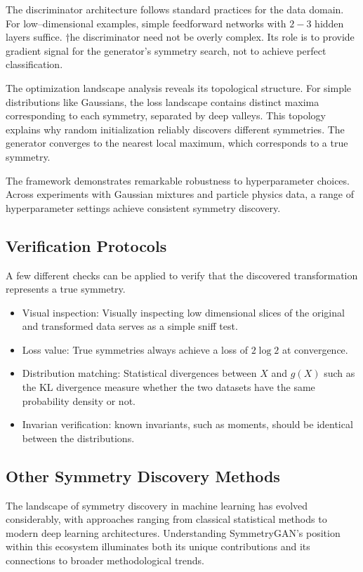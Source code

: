     The discriminator architecture follows standard practices for the data domain.
    For low--dimensional examples, simple feedforward networks with \(2-3\) hidden layers suffice.
    †he discriminator need not be overly complex.
    Its role is to provide gradient signal for the generator's symmetry search, not to achieve perfect classification.

    The optimization landscape analysis reveals its topological structure.
    For simple distributions like Gaussians, the loss landscape contains distinct maxima corresponding to each symmetry, separated by deep valleys.
    This topology explains why random initialization reliably discovers different symmetries.
    The generator converges to the nearest local maximum, which corresponds to a true symmetry.

    The framework demonstrates remarkable robustness to hyperparameter choices.
    Across experiments with Gaussian mixtures and particle physics data, a range of hyperparameter settings achieve consistent symmetry discovery.

    \subsection{Verification Protocols}
    A few different checks can be applied to verify that the discovered transformation represents a true symmetry.
    \begin{itemize}
        \item Visual inspection: Visually inspecting low dimensional slices of the original and transformed data serves as a simple sniff test.
        \item Loss value: True symmetries always achieve a loss of \(2\log2\) at convergence.
        \item Distribution matching: Statistical divergences between \(X\) and \(g(X)\) such as the KL divergence measure whether the two datasets have the same probability density or not.
        \item Invarian verification: known invariants, such as moments, should be identical between the distributions.
    \end{itemize}
    
    \subsection{Other Symmetry Discovery Methods}
        The landscape of symmetry discovery in machine learning has evolved considerably, with approaches ranging from classical statistical methods to modern deep learning architectures.
        Understanding SymmetryGAN's position within this ecosystem illuminates both its unique contributions and its connections to broader methodological trends.

